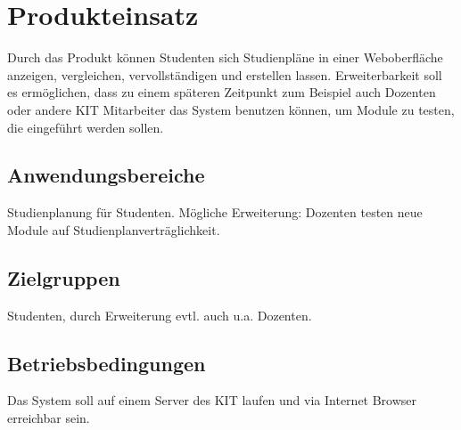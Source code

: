 \section{Produkteinsatz}
Durch das Produkt können Studenten sich Studienpläne in einer Weboberfläche anzeigen, vergleichen, vervollständigen und erstellen lassen. Erweiterbarkeit soll es ermöglichen, dass zu einem späteren Zeitpunkt zum Beispiel auch Dozenten oder andere KIT Mitarbeiter das System benutzen können, um Module zu testen, die eingeführt werden sollen. 

\subsection{Anwendungsbereiche}
Studienplanung für Studenten. Mögliche Erweiterung: Dozenten testen neue Module auf Studienplanverträglichkeit.

\subsection{Zielgruppen}
Studenten, durch Erweiterung evtl. auch u.a. Dozenten.
\subsection{Betriebsbedingungen}
Das System soll auf einem Server des KIT laufen und via Internet Browser erreichbar sein.